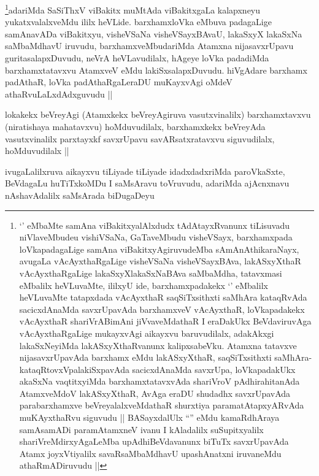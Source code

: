 \begin{artha}
\footnote[1]{`\stext' eMbaMte samAna viBakitxyalAlxdudx
  tAdAtayxRvanunx tiLisuvadu niVlaveMbudeu vishiVSaNa, GaTaveMbudu
  visheVSayx, barxhamxpada loVkapadagaLige samAna
  viBakitxyAgiruvudeMba sAmAnAthikaraNayx, avugaLa vAcAyxthaRgaLige
  visheVSaNa visheVSayxBAva, lakASxyXthaR vAcAyxthaRgaLige
  lakaSxyXlakaSxNaBAva saMbaMdha, tatavxmasi eMbalilx heVLuvaMte,
  ililxyU ide, barxhamxpadakekx `\stext' eMbalilx heVLuvaMte
  tatapxdada vAcAyxthaR saqSiTxsithxti saMhAra kataqRvAda
  sacicxdAnaMda savxrUpavAda barxhamxveV vAcAyxthaR, loVkapadakekx
  vAcAyxthaR shariVrABimAni jiVvaveMdathaR I eraDakUkx BeVdaviruvAga
  vAcAyxthaRgaLige mukayxvAgi aikayxvu baruvudilalx, adakAkxgi
  lakaSxNeyiMda lakASxyXthaRvanunx kalipxsabeVku. Atamxna tatavxve
  nijasavxrUpavAda barxhamx eMdu lakASxyXthaR, saqSiTxsithxti
  saMhAra-kataqRtovxVpalakiSxpavAda sacicxdAnaMda savxrUpa,
  loVkapadakUkx akaSxNa vaqtitxyiMda barxhamxtatavxvAda shariVroV
  pAdhirahitanAda AtamxveMdoV lakASxyXthaR, AvAga eraDU shudadhx
  savxrUpavAda parabarxhamxve beVreyalalxveMdathaR shurxtiya
  paramatAtapxyARvAda muKAyxthaRvu siguvudu || BASayxdalUlx ``\stext''
  eMdu kamaRdhAraya samAsamADi paramAtamxneV ivanu I kAladalilx
  suSupitxyalilx shariVreMdirxyAgaLeMba upAdhiBeVdavanunx biTuTx
  savxrUpavAda Atamx joyxVtiyalilx savaRsaMbaMdhavU upashAnatxni
  iruvaneMdu athaRmADiruvudu ||}adariMda SaSiThxV viBakitx muMtAda viBakitxgaLa
kalapxneyu yukatxvalalxveMdu ililx heVLide. barxhamxloVka eMbuva
padagaLige samAnavADa viBakitxyu, visheVSaNa visheVSayxBAvaU, lakaSxyX
lakaSxNa saMbaMdhavU iruvudu, barxhamxveMbudariMda Atamxna
nijasavxrUpavu guritasalapxDuvudu, neVrA heVLavudilalx, hAgeye loVka
padadiMda barxhamxtatavxvu AtamxveV eMdu lakiSxsalapxDuvudu. hiVgAdare
barxhamx padAthaR, loVka padAthaRgaLeraDU muKayxvAgi oMdeV
athaRvuLaLxdAdxguvudu ||                                              
\end{artha}

\begin{artha}
lokakekx beVreyAgi (Atamxkekx beVreyAgiruva vasutxvinalilx)
barxhamxtavxvu (niratishaya mahatavxvu) hoMduvudilalx, barxhamxkekx
beVreyAda vasutxvinalilx parxtayxkf savxrUpavu savARsatxratavxvu
siguvudilalx, hoMduvudilalx ||
\end{artha}

\begin{artha}
ivugaLalilxruva aikayxvu tiLiyade tiLiyade idadxdadxriMda paroVkaSxte,
BeVdagaLu huTiTxkoMDu I saMsAravu toVruvudu, adariMda ajAcnxnavu
nAshavAdalilx saMsArada biDugaDeyu
\end{artha}

